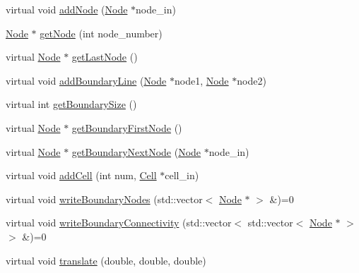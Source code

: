 \begin{DoxyCompactItemize}
virtual void \hyperlink{classmknix_1_1_body_abf7eec507e5fc918e4901864a6db0f84}{add\-Node} (\hyperlink{classmknix_1_1_node}{Node} $\ast$node\-\_\-in)
\item 
\hyperlink{classmknix_1_1_node}{Node} $\ast$ \hyperlink{classmknix_1_1_body_ac996b024251ecd5bcb9af4a932e916c2}{get\-Node} (int node\-\_\-number)
\item 
virtual \hyperlink{classmknix_1_1_node}{Node} $\ast$ \hyperlink{classmknix_1_1_body_a95fad3fdd4c18a0adcbeba2891b55140}{get\-Last\-Node} ()
\item 
virtual void \hyperlink{classmknix_1_1_body_a0303c5d1de1c19cff7448baf2564f213}{add\-Boundary\-Line} (\hyperlink{classmknix_1_1_node}{Node} $\ast$node1, \hyperlink{classmknix_1_1_node}{Node} $\ast$node2)
\item 
virtual int \hyperlink{classmknix_1_1_body_aa7de934eb85ec4e68741d0c7395a9a10}{get\-Boundary\-Size} ()
\item 
virtual \hyperlink{classmknix_1_1_node}{Node} $\ast$ \hyperlink{classmknix_1_1_body_a0cd2969a179a3d6a44607e038593028b}{get\-Boundary\-First\-Node} ()
\item 
virtual \hyperlink{classmknix_1_1_node}{Node} $\ast$ \hyperlink{classmknix_1_1_body_aac3a9453cb1a13464fa56449112188f1}{get\-Boundary\-Next\-Node} (\hyperlink{classmknix_1_1_node}{Node} $\ast$node\-\_\-in)
\item 
virtual void \hyperlink{classmknix_1_1_body_abb4237e7f457287766e29bfe0cbb0f01}{add\-Cell} (int num, \hyperlink{classmknix_1_1_cell}{Cell} $\ast$cell\-\_\-in)
\item 
virtual void \hyperlink{classmknix_1_1_body_ada574d09e98568156185eb7eef398c8f}{write\-Boundary\-Nodes} (std\-::vector$<$ \hyperlink{classmknix_1_1_node}{Node} $\ast$ $>$ \&)=0
\item 
virtual void \hyperlink{classmknix_1_1_body_ab95b00050cf3841c1b931e04eebe57e1}{write\-Boundary\-Connectivity} (std\-::vector$<$ std\-::vector$<$ \hyperlink{classmknix_1_1_node}{Node} $\ast$ $>$ $>$ \&)=0
\item 
virtual void \hyperlink{classmknix_1_1_body_a5f58f8e5398bbacc973b046be600eb5f}{translate} (double, double, double)
\end{DoxyCompactItemize}

